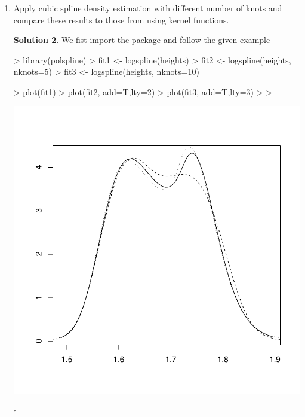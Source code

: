 \documentclass[twoside]{article}
\theoremstyle{definition}
\newtheorem*{solutionT}{Solution}
\newenvironment{solution}{\begin{cBox}\begin{solutionT}}{\hfill{\scriptsize\ensuremath{\square}}\end{solutionT}\end{cBox}}
\theoremstyle{definition}
\begin{document}
\begin{enumerate}
\begin{solution}
\end{solution}
\item Apply cubic spline density estimation with different number of knots and compare
these results to those from using kernel functions.
\begin{solution}
We fist import the package and follow the given example
\begin{Schunk}
\begin{Sinput}
> library(polspline)
> fit1 <- logspline(heights)
> fit2 <- logspline(heights, nknots=5)
> fit3 <- logspline(heights, nknots=10)
\end{Sinput}
\end{Schunk}
\begin{Schunk}
\begin{Sinput}
> plot(fit1)
> plot(fit2, add=T,lty=2)
> plot(fit3, add=T,lty=3)
> 
> 
\end{Sinput}
\end{Schunk}
\includegraphics{week3-013}



\end{solution}
\end{enumerate}
\end{document}
